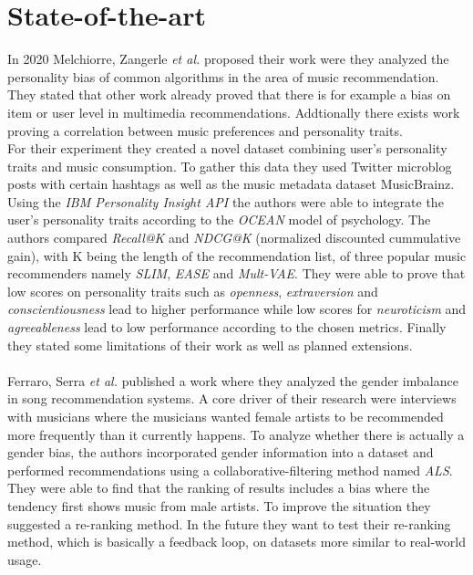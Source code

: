 \documentclass[runningheads,a4paper]{llncs}
\begin{document}
\section{State-of-the-art}
In 2020 Melchiorre, Zangerle \textit{et al.} proposed their work were they analyzed the personality bias of common algorithms in the area of music recommendation.
They stated that other work already proved that there is for example a bias on item or user level in multimedia recommendations. 
Addtionally there exists work proving a correlation between music preferences and personality traits.\\
For their experiment they created a novel dataset combining user's personality traits and music consumption.
To gather this data they used Twitter microblog posts with certain hashtags as well as the music metadata dataset MusicBrainz. 
Using the \textit{IBM Personality Insight API} the authors were able to integrate the user's personality traits according to the \textit{OCEAN} model of psychology.
The authors compared \textit{Recall@K} and \textit{NDCG@K} (normalized discounted cummulative gain), with K being the length of the recommendation list, of three popular music recommenders namely \textit{SLIM}, \textit{EASE} and \textit{Mult-VAE}.
They were able to prove that low scores on personality traits such as \textit{openness}, \textit{extraversion} and \textit{conscientiousness} lead to higher performance
while low scores for \textit{neuroticism} and \textit{agreeableness} lead to low performance according to the chosen metrics. 
Finally they stated some limitations of their work as well as planned extensions. \cite{melchiorre2020personality}\\
\\
Ferraro, Serra \textit{et al.} published a work where they analyzed the gender imbalance in song recommendation systems. A core driver of 
their research were interviews with musicians where the musicians wanted female artists to be recommended more frequently than it currently happens.
To analyze whether there is actually a gender bias, the authors incorporated gender information into a dataset and
performed recommendations using a collaborative-filtering method named \textit{ALS}.
They were able to find that the ranking of results includes a bias where the tendency first shows music from male artists. 
To improve the situation they suggested a re-ranking method. In the future they want to test their re-ranking method, which is basically a feedback loop, on datasets more similar to real-world usage. \cite{ferraro2021break}\\
\end{document}
